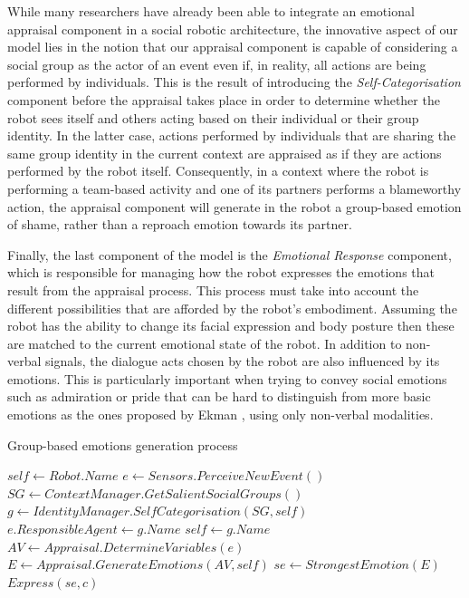 While many researchers have already been able to integrate an emotional appraisal component in a social robotic architecture, the innovative aspect of our model lies in the notion that our appraisal component is capable of considering a social group as the actor of an event even if, in reality, all actions are being performed by individuals. This is the result of introducing the \textit{Self-Categorisation} component before the appraisal takes place in order to determine whether the robot sees itself and others acting based on their individual or their group identity. In the latter case, actions performed by individuals that are sharing the same group identity in the current context are appraised as if they are actions performed by the robot itself. Consequently, in a context where the robot is performing a team-based activity and one of its partners performs a blameworthy action, the appraisal component will generate in the robot a group-based emotion of shame, rather than a reproach emotion towards its partner.

Finally, the last component of the model is the \textit{Emotional Response} component, which is responsible for managing how the robot expresses the emotions that result from the appraisal process. This process must take into account the different possibilities that are afforded by the robot's embodiment. Assuming the robot has the ability to change its facial expression and body posture then these are matched to the current emotional state of the robot. In addition to non-verbal signals, the dialogue acts chosen by the robot are also influenced by its emotions. This is particularly important when trying to convey social emotions such as admiration or pride that can be hard to distinguish from more basic emotions as the ones proposed by Ekman \cite{ekman1987universals}, using only non-verbal modalities.

\begin{algorithm}[ht]
\caption{Group-based emotions generation process}
\label{algorithm-loop}
\begin{algorithmic}
\STATE$self \leftarrow Robot.Name $
\STATE$e \leftarrow Sensors.PerceiveNewEvent() $
\STATE$SG \leftarrow ContextManager.GetSalientSocialGroups() $ 
\STATE$g \leftarrow IdentityManager.SelfCategorisation(SG, self)$ 
\STATE $e.ResponsibleAgent \leftarrow g.Name$
\STATE $self \leftarrow g.Name$
\ENDIF
\ENDIF
\STATE$AV \leftarrow Appraisal.DetermineVariables(e)$
\STATE$E \leftarrow Appraisal.GenerateEmotions(AV, self)$
\STATE$se \leftarrow StrongestEmotion(E)$
\STATE$Express(se, c)$
\ENDFOR
\ENDWHILE
\end{algorithmic}
\end{algorithm}

